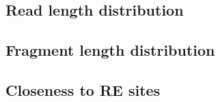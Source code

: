 \documentclass[11pt]{article}
\begin{document}
\subsection{Read length distribution}

\subsection{Fragment length distribution}

\subsection{Closeness to RE sites}




\end{document}
